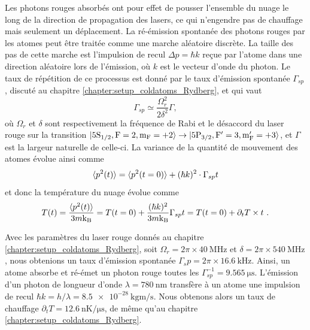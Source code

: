 Les photons rouges absorbés ont pour effet de pousser l'ensemble du nuage le long de la direction de propagation des lasers, ce qui n'engendre pas de chauffage mais seulement un déplacement.
La ré-émission spontanée des photons rouges par les atomes peut être traitée comme une marche aléatoire discrète.
La taille des pas de cette marche est l'impulsion de recul $\Delta p=\hbar k$ reçue par l'atome dans une direction aléatoire lors de l'émission, où $k$ est le vecteur d'onde du photon.
Le taux de répétition de ce processus est donné par le taux d'émission spontanée $\Gamma_{sp}$, discuté au chapitre \ref{chapter:setup_coldatoms_Rydberg}, et qui vaut
\begin{equation}
\label{eq:Gamma_sp}
\Gamma_{sp} \simeq \frac{\Omega_r^2}{2\delta^2}\Gamma,
\end{equation}
où $\Omega_r$ et $\delta$ sont respectivement la fréquence de Rabi et le désaccord du laser rouge sur la transition $\ket{\mathrm{5S_{1/2},F=2,m_F=+2}} \rightarrow \ket{\mathrm{5P_{3/2},F'=3,m_F'=+3}}$, et $\Gamma$ est la largeur naturelle de celle-ci.
La variance de la quantité de mouvement des atomes évolue ainsi comme
\begin{equation}
\label{eq:momentum_randomwalk}
\braket{p^2 (t)} = \braket{p^2(t=0)} + (\hbar k)^2 \cdot \Gamma_{sp}t
\end{equation}
et donc la température du nuage évolue comme 
\begin{equation}
\label{eq:heating_randomwalk}
T(t) = \frac{\braket{p^2 (t)}}{3m\mathrm{k_B}} =
T(t=0) + \frac{(\hbar k)^2}{3m\mathrm{k_B}} \Gamma_{sp} t
=T(t=0) + \partial_t T \times t~.
\end{equation}

Avec les paramètres du laser rouge donnés au chapitre \ref{chapter:setup_coldatoms_Rydberg}, soit $\Omega_r = 2\pi\times \SI{40}{\MHz}$ et $\delta=2\pi\times\SI{540}{\MHz}$, nous obtenions un taux d'émission spontanée $\Gamma_sp = 2\pi\times\SI{16.6}{\kHz}$.
Ainsi, un atome absorbe et ré-émet un photon rouge toutes les $\Gamma_{sp}^{-1}=\SI{9.565}{\us}$.
L'émission d'un photon de longueur d'onde $\lambda=\SI{780}{\nano\metre}$ transfère à un atome une impulsion de recul $\hbar k = h/\lambda = \SI{8.5e-28}{\kg\m\per\s}$.
Nous obtenons alors un taux de chauffage $\partial_t T = \SI{12.6}{\nano\K/\us}$, de même qu'au chapitre \ref{chapter:setup_coldatoms_Rydberg}.

